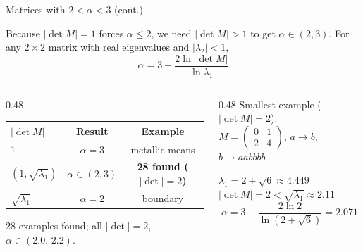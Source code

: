 \documentclass[aspectratio=169, 11pt]{beamer}
\begin{document}
\begin{frame}[shrink=3]{Matrices with $2<\alpha<3$ (cont.)}

\small
Because $|\det M|=1$ forces $\alpha\leq2$, we need $|\det M|>1$ to get $\alpha\in(2,3)$.
For any $2\times2$ matrix with real eigenvalues and $|\lambda_2|<1$,
\[
  \boxed{\;\alpha = 3 - \frac{2\ln|\det M|}{\ln\lambda_1}\;}
\]

\vspace{-0.3em}
\begin{columns}[c]
\begin{column}{0.48\textwidth}
\centering
\begin{tabular}{lcc}
\toprule
$|\det M|$ & Result & Example \\
\midrule
1 & $\alpha=3$ & metallic means \\
$(1,\!\sqrt{\lambda_1})$ & $\alpha\!\in\!(2,3)$ & \textbf{28 found ($|\det|{=}2$)} \\
$\sqrt{\lambda_1}$ & $\alpha=2$ & boundary \\
\bottomrule
\end{tabular}

\vspace{0.3em}
28 examples found; all $|\det|=2$, $\alpha\in(2.0,\,2.2)$.
\end{column}
\begin{column}{0.48\textwidth}
\centering
Smallest example ($|\det M|=2$):\\
$M=\!\begin{pmatrix}0&1\\2&4\end{pmatrix}$,\;
$a\!\to\! b$,\; $b\!\to\! aabbbb$

\vspace{0.3em}
$\lambda_1=2{+}\sqrt{6}\approx4.449$\\
$|\det M|=2 < \sqrt{\lambda_1}\approx2.11$
\[
  \alpha = 3-\frac{2\ln2}{\ln(2+\sqrt{6})} = \mathbf{2.071}
\]
\end{column}
\end{columns}
\end{frame}
\end{document}
